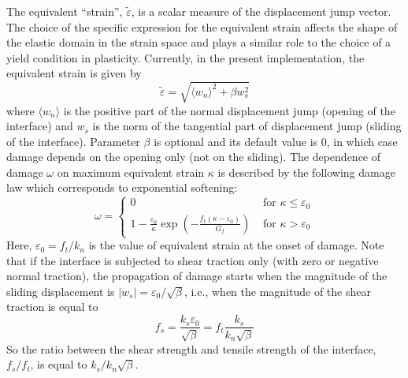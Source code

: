 \documentclass[a4paper]{article}
\begin{document}
The equivalent ``strain'', $\tilde\varepsilon$, is a scalar measure of the displacement jump vector. The choice of the specific expression
for the equivalent strain affects the shape of the elastic domain
in the strain space and plays a similar role to the choice of a yield
condition in plasticity.
Currently, in the present implementation,  the equivalent strain is given by
$$
\tilde\varepsilon = \sqrt{\langle w_n\rangle^2 + \beta w_s^2}
$$ 
where $\langle w_n\rangle$ is the positive part of the normal displacement jump (opening of the interface)
and $w_s$ is the norm of the tangential part of displacement jump (sliding of the interface). Parameter $\beta$
is optional and its default value is 0, in which case damage depends on the opening only (not on the sliding).
The dependence of damage $\omega$ on maximum equivalent strain $\kappa$ is described by the following damage
law which corresponds to exponential softening:
$$
\omega = \left\{ \begin{array}{ll}
0 & \mbox{ for } \kappa\le \varepsilon_0 \\
1 - \displaystyle\frac{\varepsilon_0}{\kappa}  \exp\left( - \displaystyle\frac{f_t( \kappa - \varepsilon_0 )}{G_f} \right) & \mbox{ for } \kappa> \varepsilon_0
\end{array}\right.
$$
Here, $\varepsilon_0=f_t/k_n$ is the value of equivalent strain at the onset of damage.
Note that if the interface is subjected to shear traction only (with zero or negative normal traction),
the propagation of damage starts when the magnitude of the sliding displacement is $\vert w_s\vert=\varepsilon_0/\sqrt{\beta}$, i.e.,
when the magnitude of the shear traction is equal to 
$$
f_s = \frac{k_s \varepsilon_0}{\sqrt{\beta}} = f_t\frac{k_s }{k_n\sqrt{\beta}}
$$
So the ratio between the shear strength and tensile strength of the interface, $f_s/f_t$,
is equal to $k_s/k_n\sqrt{\beta}$.
\end{document}
